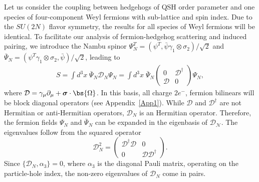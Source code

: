 \documentclass[aps,prb,amsmath,amssymb,floatfix,twocolumn]{revtex4}
\begin{document}
Let us consider the coupling between hedgehogs of QSH order parameter and one species of four-component Weyl fermions with sub-lattice and spin index. Due to the $SU(2N)$ flavor symmetry, the results for all species of Weyl fermions will be identical.%
To facilitate our analysis of fermion-hedgehog scattering and induced pairing, we introduce the Nambu spinor $\Psi^T_N= (\psi^T, \bar{\psi}\gamma_1 \otimes \sigma_2)/\sqrt{2}$ and $\bar{\Psi}_N= (\psi^T \gamma_1 \otimes \sigma_2, \bar{\psi})/\sqrt{2}$, leading to 
\begin{eqnarray}
S=\int d^3x \; \bar{\Psi}_N \mathcal{D}_N \Psi_N=\int d^3x \; \bar{\Psi}_N \left(\begin{array}{cc}
0 & \mathcal{D}^\dagger\\
\mathcal{D} & 0
\end{array}\right) \Psi_N,
\end{eqnarray} where 
$\mathcal{D}=\gamma_\mu \partial_\mu +  \boldsymbol \sigma \cdot \bs{\Omega} $. In this basis, all charge $2 e^-$, fermion bilinears will be block diagonal operators (see Appendix~\ref{App1}). While $\mathcal{D}$ and $\mathcal{D}^\dagger$ are not Hermitian or anti-Hermitian operators, $\mathcal{D}_N$ is an Hermitian operator. Therefore, the fermion fields $\Psi_N$ and $\bar{\Psi}_N$ can be expanded in the eigenbasis of $\mathcal{D_N}$. %
The eigenvalues follow from the squared operator \begin{equation}
\mathcal{D}^2_N=\left(\begin{array}{cc}
\mathcal{D}^\dagger\mathcal{D} & 0\\
0 & \mathcal{D}\mathcal{D}^\dagger
\end{array}\right). \end{equation} 
Since $\{ \mathcal{D}_N, \alpha_3 \} = 0$, where $\alpha_3$ is the diagonal Pauli matrix, operating on the particle-hole index, the non-zero eigenvalues of $\mathcal{D}_N$ come in pairs. 
\end{document}
